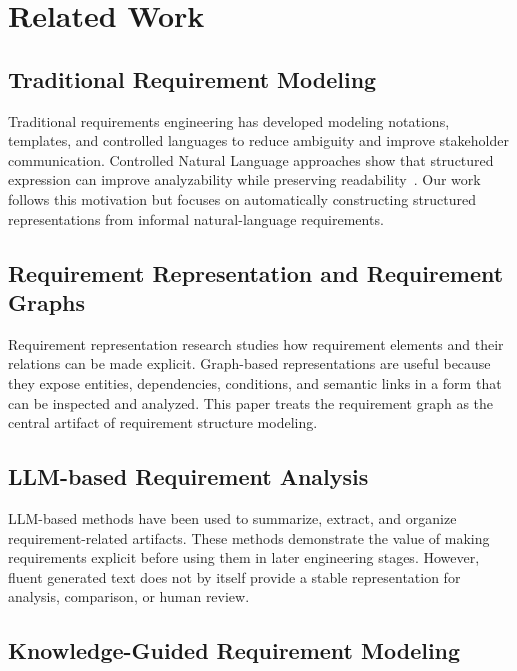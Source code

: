 \section{Related Work}
\label{related_work}

\subsection{Traditional Requirement Modeling}
\label{sec:rw-traditional}

Traditional requirements engineering has developed modeling notations, templates, and controlled languages to reduce ambiguity and improve stakeholder communication.
Controlled Natural Language approaches show that structured expression can improve analyzability while preserving readability~\cite{darifControlledNaturalLanguage2026}.
Our work follows this motivation but focuses on automatically constructing structured representations from informal natural-language requirements.

\subsection{Requirement Representation and Requirement Graphs}
\label{sec:rw-representation}

Requirement representation research studies how requirement elements and their relations can be made explicit.
Graph-based representations are useful because they expose entities, dependencies, conditions, and semantic links in a form that can be inspected and analyzed.
This paper treats the requirement graph as the central artifact of requirement structure modeling.

\subsection{LLM-based Requirement Analysis}
\label{sec:rw-llm-requirements}

LLM-based methods have been used to summarize, extract, and organize requirement-related artifacts.
These methods demonstrate the value of making requirements explicit before using them in later engineering stages.
However, fluent generated text does not by itself provide a stable representation for analysis, comparison, or human review.

\subsection{Knowledge-Guided Requirement Modeling}
\label{sec:rw-knowledge}

